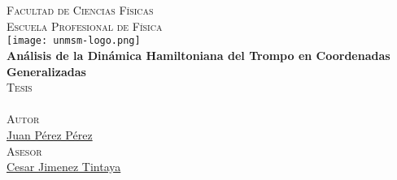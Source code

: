 \documentclass[11pt, oneside]{Thesis} %
\begin{document}
\begin{titlepage}
	\begin{center}
		
		\textsc{\Large \univname}\\[0.5cm] %
		\Large {}\\[0.4cm] %
		\textsc{\Large Facultad de Ciencias Físicas}\\[0.4cm] 
		\textsc{\Large Escuela Profesional de Física}\\[0.8cm] %
		
		\texttt{[image: unmsm-logo.png]}\\[0.7cm] %
		{\LARGE \bfseries Análisis de la Dinámica Hamiltoniana del Trompo en Coordenadas Generalizadas }\\[0.6cm] %
		\textsc{\Large Tesis}\\[0.3cm] 
		\large {}\\[0.6cm] %
		
		\textsc{\Large Autor}\\[0.3cm] 
		\href{http://www.tesista.biz}{Juan Pérez Pérez}\\[0.6cm] %
		
		\textsc{\Large Asesor}\\[0.3cm] 
		\href{https://ctivitae.concytec.gob.pe/appDirectorioCTI/VerDatosInvestigador.do?id_investigador=0017677}{Cesar Jimenez Tintaya}\\[2.2cm] %
		
		\large {}\\[0.3cm]
		\Large {}\\[0.3cm]
		
		\vfill
	\end{center}
	
\end{titlepage}


\end{document}
